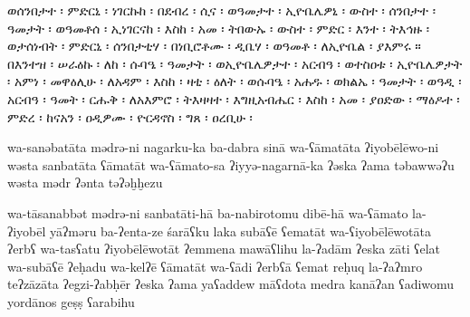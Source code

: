 

\begin{ethiopictext}
    ወሰንበታተ ፡ ምድርኒ ፡ ነገርኩከ ፡ በደብረ ፡ ሲና ፡ ወዓመታተ ፡
    ኢዮቤሌዎኒ ፡ ውስተ ፡ ሰንበታተ ፡ ዓመታት ፡ ወዓመቶሰ ፡ ኢነገርናከ ፡
    እስከ ፡ አመ ፡ ትበውኡ ፡ ውስተ ፡ ምድር ፡ እንተ ፡ ትእኅዙ ፡
    ወታሰነብት ፡ ምድርኒ ፡ ሰንበታቲሃ ፡ በነቢሮቶሙ ፡ ዲቤሃ ፡ 
    ወዓመቶ ፡ ለኢዮቤል ፡ ያእምሩ ። 
    በእንተዝ ፡ ሠራዕኩ ፡ ለከ ፡ 
    ሱባዔ ፡ ዓመታት ፡ ወኢዮቤሌዎታተ ፡ አርብዓ ፡ ወተስዐቱ ፡ ኢዮቤሌዎታት ፡
    አምነ ፡ መዋዕሊሁ ፡ ለአዳም ፡ እስከ ፡ ዛቲ ፡ ዕለት ፡ ወሱባዔ ፡
    አሐዱ ፡ ወክልኤ ፡ ዓመታት ፡ ወዓዲ ፡ አርብዓ ፡ ዓመት ፡ 
    ርሑቅ ፡ ለአእምሮ ፡ ትእዛዛተ ፡ እግዚአብሔር ፡ እስከ ፡ አመ ፡ ያዐድው ፡
    ማዕዶተ ፡ ምድረ ፡ ከናአን ፡ ዐዲዎሙ ፡ ዮርዳኖስ ፡ ግጸ ፡ ዐረቢሁ ፡
\end{ethiopictext}
\begin{transliteration}
    wa-sanəbatāta mədrə-ni nagarku-ka ba-dabra sinā wa-ʕāmatāta
    ʔiyobēlēwo-ni wəsta sanbatāta ʕāmatāt wa-ʕāmato-sa ʔiyyə-nagarnā-ka
    ʔəska ʔama təbawwəʔu wəsta mədr ʔənta təʔəḫḫezu

    wa-tāsanabbət mədrə-ni sanbatāti-hā ba-nabirotomu dibē-hā
    wa-ʕāmato la-ʔiyobēl yāʔməru
    ba-ʔenta-ze śarāʕku laka
    subāʕē ʕematāt wa-ʕiyobēlēwotāta ʔerbʕ wa-tasʕatu ʔiyobēlēwotāt
    ʔemmena mawāʕlihu la-ʔadām ʔeska zāti ʕelat wa-subāʕē
    ʔeḥadu wa-kelʔē ʕāmatāt wa-ʕādi ʔerbʕā ʕemat
    reḥuq la-ʔaʔmro teʔzāzāta ʔegzi-ʔabḥēr ʔeska ʔama yaʕaddew
    māʕdota medra kanāʔan ʕadiwomu yordānos geṣṣ ʕarabihu

\end{transliteration}

